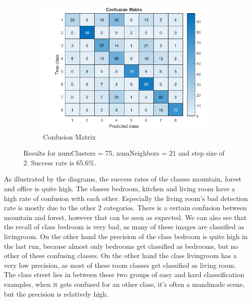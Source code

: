 \begin{figure}[h]
\begin{subfigure}{0.3\textwidth}
	\end{subfigure}
	\begin{subfigure}{0.65\textwidth}
		\includegraphics[width=\textwidth]{figures/confusion_75C_21NN_2S.png}
		\caption{Confusion Matrix}
	\end{subfigure}

	\caption{Results for numClusters = 75, numNeighbors = 21 and step size of 2. Success rate is 65.6\%.}
	\label{fig:a5:75c21nn2s}
\end{figure}

As illustrated by the diagrams, the success rates of the classes mountain, forest and office is quite high. The classes bedroom, kitchen and living room have a high rate of confusion with each other. Especially the living room's bad detection rate is mostly due to the other 2 categories. There is a certain confusion between mountain and forest, however that can be seen as expected. We can also see that the recall of class bedroom is very bad, as many of these images are classified as livingroom. On the other hand the precision of the class bedroom is quite high in the last run, because almost only bedrooms get classified as bedrooms, but no other of these confusing classes. On the other hand the class livingroom has a very low precision, as most of these room classes get classified as living room. The class street lies in between these two groups of easy and hard classsification examples, when it gets confused for an other class, it's often a mandmade scene, but the precision is relatively high. 

